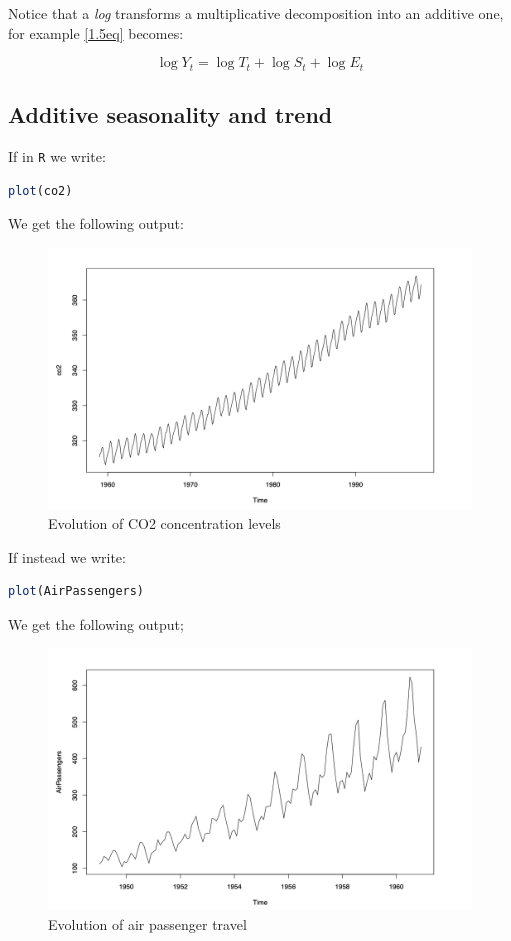 \documentclass[dvipsnames,12pt]{book}
\begin{document}
                \noindent Notice that a \textit{log} transforms a multiplicative decomposition into an additive one, for example \ref{1.5eq} becomes:
                
                \begin{equation}
                    \log Y_t = \log T_t + \log S_t + \log E_t
                \end{equation}

            \subsection{Additive seasonality and trend}

                If in \texttt{R} we write:
            
\begin{lstlisting}[language=R]
plot(co2)
\end{lstlisting}

                \noindent We get the following output:

                \begin{figure}[h]
                    \centering
                    \includegraphics[width=0.5\linewidth]{L1-2.png}
                    \caption{Evolution of CO2 concentration levels}
                    \label{fig:L1-2}
                \end{figure}

\newpage
                \noindent If instead we write:

\begin{lstlisting}[language=R]
plot(AirPassengers)
\end{lstlisting}

                \noindent We get the following output;

                \begin{figure}[h]
                    \centering
                    \includegraphics[width=0.5\linewidth]{L1-3.png}
                    \caption{Evolution of air passenger travel}
                    \label{fig:L1-3}
                \end{figure}
\end{document}
